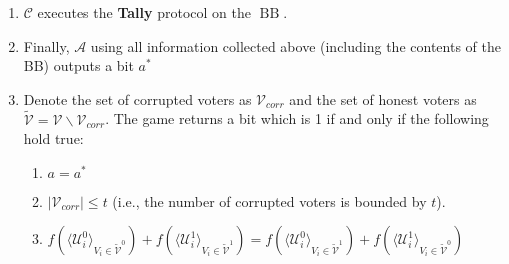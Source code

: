 \documentclass[12pt]{article}
\DeclareMathOperator{\bb}{BB}
\begin{document}
\begin{enumerate}
\item $\mathcal{C}$ executes the \textbf{Tally} protocol on the $\bb$. 
\item Finally, $\mathcal{A}$ using all information collected above (including the contents of the BB) outputs a bit $a^*$
\item Denote the set of corrupted voters as $\mathcal{V}_{corr}$ and the set of honest voters as $\tilde{\mathcal{V}}= \mathcal{V} \backslash \mathcal{V}_{corr}$. The game returns a bit which is 1 if and only if the following hold true:
\begin{enumerate}
 \item $a = a^*$
 \item $|\mathcal{V}_{corr}| \leq t$ (i.e., the number of corrupted voters is bounded by $t$).
 \item $f(\langle \mathcal{U}^0_i \rangle _{V_i \in \tilde{\mathcal{V}}^0} ) + f(\langle \mathcal{U}^1_i \rangle _{V_i \in \tilde{\mathcal{V}}^1} ) =  f(\langle \mathcal{U}^0_i \rangle _{V_i \in \tilde{\mathcal{V}}^1} ) +  f(\langle \mathcal{U}^1_i \rangle _{V_i \in \tilde{\mathcal{V}}^0} )$
\end{enumerate}
\end{enumerate}

 
 
\end{document}
